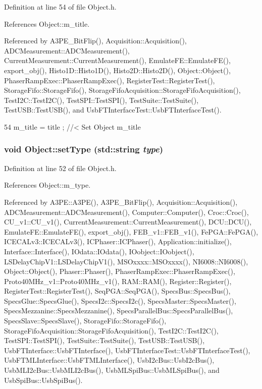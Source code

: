Definition at line 54 of file Object.h.

References Object::m\_\-title.

Referenced by A3PE\_\-BitFlip(), Acquisition::Acquisition(), ADCMeasurement::ADCMeasurement(), CurrentMeasurement::CurrentMeasurement(), EmulateFE::EmulateFE(), export\_\-obj(), Histo1D::Histo1D(), Histo2D::Histo2D(), Object::Object(), PhaserRampExec::PhaserRampExec(), RegisterTest::RegisterTest(), StorageFifo::StorageFifo(), StorageFifoAcquisition::StorageFifoAcquisition(), TestI2C::TestI2C(), TestSPI::TestSPI(), TestSuite::TestSuite(), TestUSB::TestUSB(), and UsbFTInterfaceTest::UsbFTInterfaceTest().


\begin{DoxyCode}
54 { m_title = title ; } //< Set Object m_title
\end{DoxyCode}
\hypertarget{classObject_aae534cc9d982bcb9b99fd505f2e103a5}{
\subsubsection[{setType}]{\setlength{\rightskip}{0pt plus 5cm}void Object::setType (std::string {\em type})}}
\label{classObject_aae534cc9d982bcb9b99fd505f2e103a5}


Definition at line 52 of file Object.h.

References Object::m\_\-type.

Referenced by A3PE::A3PE(), A3PE\_\-BitFlip(), Acquisition::Acquisition(), ADCMeasurement::ADCMeasurement(), Computer::Computer(), Croc::Croc(), CU\_\-v1::CU\_\-v1(), CurrentMeasurement::CurrentMeasurement(), DCU::DCU(), EmulateFE::EmulateFE(), export\_\-obj(), FEB\_\-v1::FEB\_\-v1(), FePGA::FePGA(), ICECALv3::ICECALv3(), ICPhaser::ICPhaser(), Application::initialize(), Interface::Interface(), IOdata::IOdata(), IOobject::IOobject(), LSDelayChipV1::LSDelayChipV1(), MSOxxxx::MSOxxxx(), NI6008::NI6008(), Object::Object(), Phaser::Phaser(), PhaserRampExec::PhaserRampExec(), Proto40MHz\_\-v1::Proto40MHz\_\-v1(), RAM::RAM(), Register::Register(), RegisterTest::RegisterTest(), SeqPGA::SeqPGA(), SpecsBus::SpecsBus(), SpecsGlue::SpecsGlue(), SpecsI2c::SpecsI2c(), SpecsMaster::SpecsMaster(), SpecsMezzanine::SpecsMezzanine(), SpecsParallelBus::SpecsParallelBus(), SpecsSlave::SpecsSlave(), StorageFifo::StorageFifo(), StorageFifoAcquisition::StorageFifoAcquisition(), TestI2C::TestI2C(), TestSPI::TestSPI(), TestSuite::TestSuite(), TestUSB::TestUSB(), UsbFTInterface::UsbFTInterface(), UsbFTInterfaceTest::UsbFTInterfaceTest(), UsbFTMLInterface::UsbFTMLInterface(), UsbI2cBus::UsbI2cBus(), UsbMLI2cBus::UsbMLI2cBus(), UsbMLSpiBus::UsbMLSpiBus(), and UsbSpiBus::UsbSpiBus().


